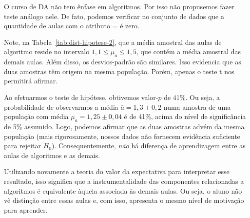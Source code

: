 O curso de DA não tem ênfase em algoritmos.
Por isso não propusemos fazer teste análogo nele.
De fato, podemos verificar no conjunto de dados que a quantidade de aulas com o atributo  =  é zero.

Note, na Tabela~\ref{tab:dist-hipotese-2}, que a média amostral das aulas de algoritmo reside no intervalo $1,1 \le \mu_a \le 1,5$, que contém a média amostral das demais aulas.
Além disso, os desvios-padrão são similares.
Isso evidencia que as duas amostras têm origem na mesma população.
Porém, apenas o teste t nos permitirá afirmar.

Ao efetuarmos o teste de hipótese, obtivemos valor-$p$ de 41\%.
Ou seja, a probabilidade de observarmos a média $\bar a = 1,3 \pm 0,2$ numa amostra de uma população com média $\mu_a = 1,25 \pm 0,04$ é de 41\%, acima do nível de significância de 5\% assumido.
Logo, podemos afirmar que as duas amostras advém da mesma população (mais rigorosamente, nossos dados não fornecem evidência suficiente para rejeitar $H_0$).
Consequentemente, \emph{não} há diferença de aprendizagem entre as aulas de algoritmos e as demais.

Utilizando novamente a teoria do valor da expectativa para interpretar esse resultado, isso significa que a instrumentalidade das componentes relacionadas a algoritmos é equivalente àquela associada às demais aulas.
Ou seja, o aluno não vê distinção entre essas aulas e, com isso, apresenta o mesmo nível de motivação para aprender.